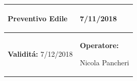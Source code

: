 \documentclass[a4paper]{article}
\begin{document}
                          \begin{center}
                          \begin{tabular}{|L{89mm} R{60mm}| }
                          \hline
                          \vspace{2.5mm}
                          \begin{spacing}{0}
                            \textbf{Preventivo Edile}
                          \end{spacing}&
                          \vspace{2.5mm}
                          \begin{spacing}{0}
        
                     7/11/2018

                          \end{spacing}\\
                          \hline
                          \vspace{2.5mm}
                          \begin{spacing}{0}
                            \textbf{Validit\'a:}
                       7/12/2018
                          \end{spacing} &
                          \vspace{2.5mm}
                          \begin{spacing}{0}
                            \textbf{Operatore:}

                       Nicola Pancheri
                          \end{spacing} \\
                          \hline
                          \end{tabular}
                          \end{center}
                        
\end{document}
